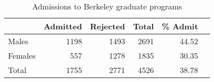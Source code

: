 \begin{table}[htb]
\caption{Admissions to Berkeley graduate programs}
\label{tab:berk22}
 \begin{center}
\begin{tabular}{l|rr|rrr}
\hline
  & Admitted & Rejected & Total & \% Admit\\%
\hline
 Males & 1198 & 1493 & 2691  & 44.52\\%
 Females & 557 & 1278 & 1835 & 30.35\\%
\hline
 Total & 1755 & 2771 & 4526  & 38.78\\%
\hline
\end{tabular}
\end{center}
\end{table}

